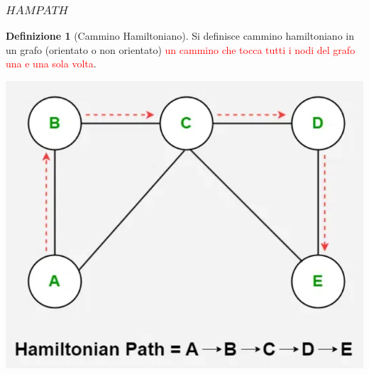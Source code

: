 \documentclass{article}  %
\theoremstyle{definition}
\newtheorem{definition}{Definizione}[section]
\begin{document}
\subsubsection{$HAMPATH$}
\begin{definition}[Cammino Hamiltoniano]
	Si definisce cammino hamiltoniano in un grafo (orientato o non orientato) \textcolor{red}{un cammino
		che tocca tutti i nodi del grafo una e una sola volta}.
\end{definition}
\begin{center}
	\includegraphics[width=0.3\linewidth]{hampath-example.png}
\end{center}
\end{document}
